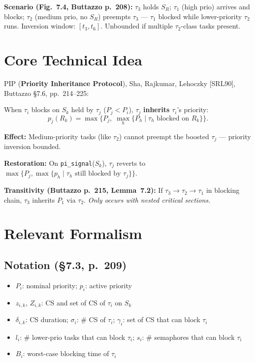 \documentclass[conference,onecolumn]{IEEEtran}
\begin{document}
\textbf{Scenario (Fig.~7.4, Buttazzo p.~208):} $\tau_3$ holds $S_R$;
$\tau_1$ (high prio) arrives and blocks; $\tau_2$ (medium prio, no $S_R$)
preempts $\tau_3$ --- $\tau_1$ blocked while lower-priority $\tau_2$ runs.
Inversion window: $[t_3, t_6]$. Unbounded if multiple $\tau_2$-class
tasks present.

\section{Core Technical Idea}

PIP (\textbf{Priority Inheritance Protocol}), Sha, Rajkumar, Lehoczky
[SRL90], Buttazzo \S7.6, pp.~214--225:

When $\tau_i$ blocks on $S_k$ held by $\tau_j$ ($P_j < P_i$),
$\tau_j$ \textbf{inherits} $\tau_i$'s priority:
\begin{equation}
  p_j(R_k) = \max\!\bigl\{P_j,\;\max_h\{P_h \mid \tau_h\text{ blocked on }R_k\}\bigr\}.
  \label{eq:pip}
\end{equation}

\textbf{Effect:} Medium-priority tasks (like $\tau_2$) cannot preempt
the boosted $\tau_j$ --- priority inversion bounded.

\textbf{Restoration:} On \texttt{pi\_signal}($S_k$), $\tau_j$ reverts to
$\max\{P_j, \max\{p_h \mid \tau_h\text{ still blocked by }\tau_j\}\}$.

\textbf{Transitivity (Buttazzo p.~215, Lemma~7.2):} If $\tau_3 \to \tau_2
\to \tau_1$ in blocking chain, $\tau_3$ inherits $P_1$ via $\tau_2$.
\emph{Only occurs with nested critical sections.}

\section{Relevant Formalism}

\subsection{Notation (\S7.3, p.~209)}
\begin{itemize}
  \item $P_i$: nominal priority; $p_i$: active priority
  \item $z_{i,k}$, $Z_{i,k}$: CS and set of CS of $\tau_i$ on $S_k$
  \item $\delta_{i,k}$: CS duration; $\sigma_i$: \# CS of $\tau_i$;
        $\gamma_i$: set of CS that can block $\tau_i$
  \item $l_i$: \# lower-prio tasks that can block $\tau_i$;
        $s_i$: \# semaphores that can block $\tau_i$
  \item $B_i$: worst-case blocking time of $\tau_i$
\end{itemize}
\end{document}
